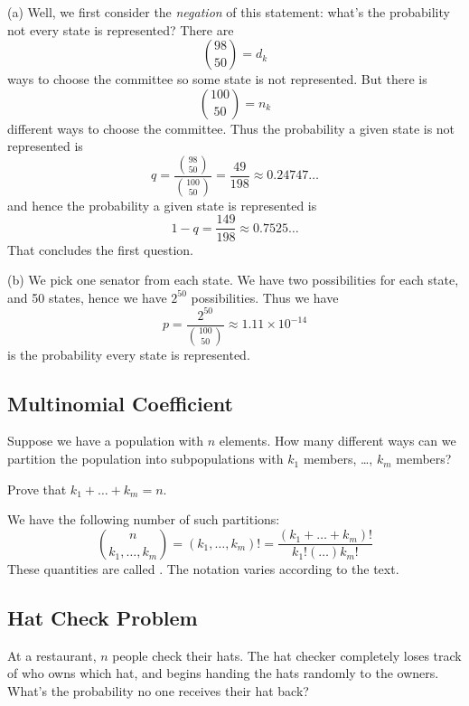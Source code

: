 (a) Well, we first consider the \emph{negation} of this statement: what's
the probability not every state is represented? There are
\begin{equation}
\binom{98}{50} = d_{k}
\end{equation}
ways to choose the committee so some state is not represented. But there
is 
\begin{equation}
\binom{100}{50}=n_{k}
\end{equation}
different ways to choose the committee. Thus the probability a given state is
not represented is
\begin{equation}
q = \frac{\displaystyle\binom{98}{50}}{\displaystyle\binom{100}{50}} = \frac{49}{198}\approx 0.24747\dots
\end{equation}
and hence the probability a given state is represented is
\begin{equation}
1-q = \frac{149}{198} \approx 0.7525\dots
\end{equation}
That concludes the first question.

(b)
We pick one senator from each state. We have two possibilities for each
state, and 50 states, hence we have $2^{50}$ possibilities. Thus we have
\begin{equation}
p = \frac{2^{50}}{\displaystyle\binom{100}{50}} \approx 1.11\times10^{-14}
\end{equation}
is the probability every state is represented.

\subsection{Multinomial Coefficient}
\M
Suppose we have a population with $n$ elements. How many different ways
can we partition the population into subpopulations with $k_1$
members, \dots, $k_m$ members?

\begin{xca}
Prove that $k_1+\dots+k_m=n$.
\end{xca}

We have the following number of such partitions:
\begin{equation}
\binom{n}{k_1,\dots,k_m} = (k_1,\dots,k_m)! = \frac{(k_1+\dots+k_m)!}{k_1!(\dots)k_m!}
\end{equation}
These quantities are called .
The notation varies according to the text. 

\subsection{Hat Check Problem}\label{subsec:hatCheckProblem}
At a restaurant, $n$ people check their hats.
The hat checker completely loses track of who owns which hat, and begins
handing the hats randomly to the owners. What's the probability no one
receives their hat back?


